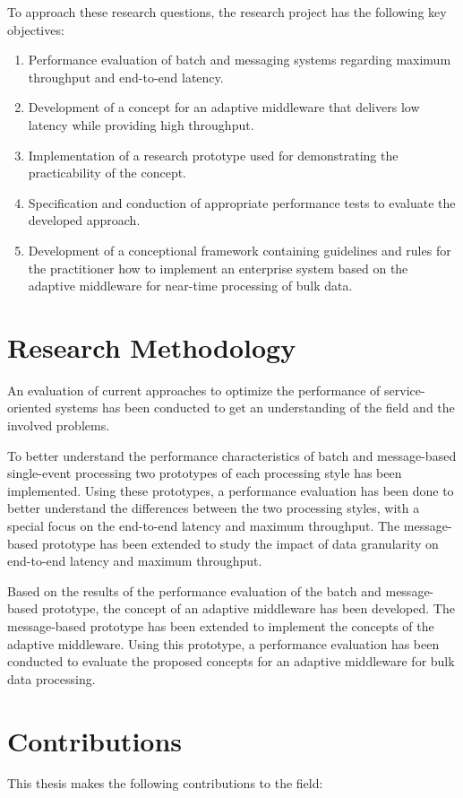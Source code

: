 To approach these research questions, the research project has the following key objectives:
\begin{enumerate}[label=\Alph*.]
	\item Performance evaluation of batch and messaging systems regarding maximum throughput and end-to-end latency.
	\item Development of a concept for an adaptive middleware that delivers low latency while providing high throughput.
	\item Implementation of a research prototype used for demonstrating the practicability of the concept.
	\item Specification and conduction of appropriate performance tests to evaluate the developed approach.
	\item Development of a conceptional framework containing guidelines and rules for the practitioner how to implement an enterprise system based on the adaptive middleware for near-time processing of bulk data.
\end{enumerate}

\section{Research Methodology}
An evaluation of current approaches to optimize the performance of service-oriented systems has been conducted to get an understanding of the field and the involved problems.

To better understand the performance characteristics of batch and message-based single-event processing two prototypes of each processing style has been implemented. Using these prototypes, a performance evaluation has been done to better understand the differences between the two processing styles, with a special focus on the end-to-end latency and maximum throughput. The message-based prototype has been extended to study the impact of data granularity on end-to-end latency and maximum throughput.

Based on the results of the performance evaluation of the batch and message-based prototype, the concept of an adaptive middleware has been developed. The message-based prototype has been extended to implement the concepts of the adaptive middleware. Using this prototype, a performance evaluation has been conducted to evaluate the proposed concepts for an adaptive middleware for bulk data processing.

\newpage

\section{Contributions}\label{sec:contributions}
This thesis makes the following contributions to the field:

